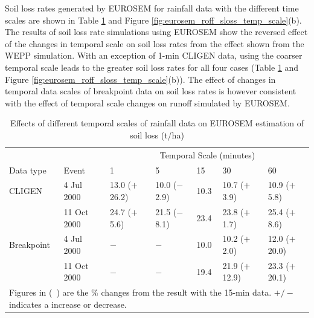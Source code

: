 
Soil loss rates generated by EUROSEM for rainfall data with the different time
scales are shown in Table
\ref{tab:DifferentTemporalScalesOfRainfallDataOnEUROSEMSoilLoss} and Figure
\ref{fig:eurosem_roff_sloss_temp_scale}(b). The results of soil loss rate
simulations using EUROSEM show the reversed effect of the changes in temporal
scale on soil loss rates from the effect shown from the WEPP simulation. With an
exception of 1-min CLIGEN data, using the coarser temporal scale leads to the
greater soil loss rates for all four cases (Table
\ref{tab:DifferentTemporalScalesOfRainfallDataOnEUROSEMSoilLoss} and Figure
\ref{fig:eurosem_roff_sloss_temp_scale}(b)). The effect of changes in
temporal data scales of breakpoint data on soil loss rates is however
consistent with the effect of temporal scale changes on runoff simulated by
EUROSEM.

\begin{table}[htbp]
  \centering
  \footnotesize
  \caption[Effects of different temporal scales of rainfall data on EUROSEM
estimation of soil loss]{Effects of different temporal scales of rainfall data
on EUROSEM estimation of soil loss (t/ha)}
  \label{tab:DifferentTemporalScalesOfRainfallDataOnEUROSEMSoilLoss}
    \begin{tabular}{lllllll}
    \toprule
    & & \multicolumn{5}{c}{Temporal Scale (minutes)}\\
      \cmidrule{3-7}
    Data type & Event & 1 & 5 & 15 & 30 & 60 \\
    \midrule
    CLIGEN & 4 Jul 2000 & 13.0 ($+$26.2) & 10.0 ($-$2.9) & 10.3 & 10.7 ($+$3.9)
& 10.9 ($+$5.8) \\
     & 11 Oct 2000 & 24.7 ($+$5.6) & 21.5 ($-$8.1) & 23.4 & 23.8 ($+$1.7) & 25.4
($+$8.6) \\
     \midrule
    Breakpoint & 4 Jul 2000 & $-$ & $-$ & 10.0 & 10.2 ($+$2.0) & 12.0 ($+$20.0)
\\
     & 11 Oct 2000 & $-$ & $-$ & 19.4 & 21.9 ($+$12.9) & 23.3 ($+$20.1) \\
    \bottomrule
    \multicolumn{7}{p{12cm}}{\footnotesize Figures in (\ ) are the \% changes
from the result with the 15-min data. $+/-$ indicates a increase or decrease.}\\
    \end{tabular}
\end{table}

